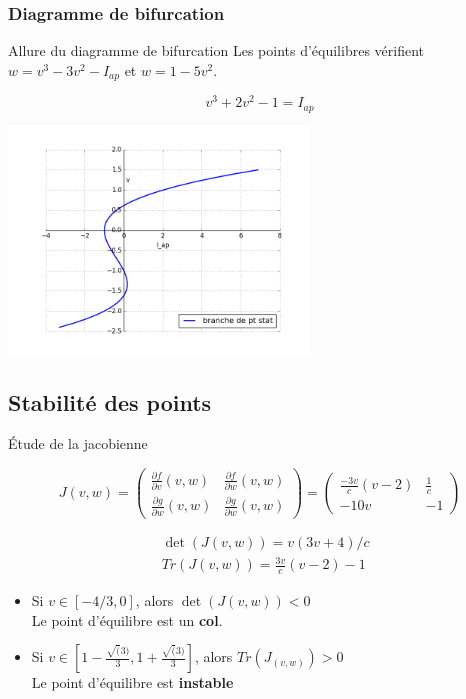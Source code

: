 \documentclass[xcolor={dvipsnames},10pt]{beamer}
\begin{document}
\subsubsection*{Diagramme de bifurcation}

\begin{frame}{Allure du diagramme de bifurcation}
Les points d'équilibres vérifient $w = v^3 - 3 v^2 - I_{ap}$ et $w = 1-5v^2$.


\begin{equation*}
v^3 + 2 v^2 -1 =I_{ap}
\end{equation*}
\begin{center}
\includegraphics[width=0.6\textwidth]{bif1.png}
\end{center}
\end{frame}



\subsection{Stabilité des points}
\begin{frame}{Étude de la jacobienne}

\begin{equation*}
J(v,w)=
\begin{pmatrix}
{\frac{\partial f}{\partial v}(v,w)} & {\frac{\partial f}{\partial w}(v,w)} \\ {\frac{\partial g}{\partial w}(v,w)} & {\frac{\partial g}{\partial w}(v,w)}
\end{pmatrix}
=
\begin{pmatrix}
{\frac{-3v}{c}(v-2)} & \displaystyle{\frac{1}{c}} \\ -10v & -1
\end{pmatrix}
\end{equation*}

\begin{align*}
&\det(J(v,w)) = v(3v+4)/c \\
& Tr(J(v,w)) = \frac{3v}{c}(v-2) -1
\end{align*}

\begin{itemize}
\item<2-> Si $v \in [-4/3,0]$, alors $\det(J(v,w))<0$ \\
		 Le point d'équilibre est un \textbf{col}.
\item<3> Si $v \in [1-\frac{\sqrt(3)}{3}, 1 + \frac{\sqrt(3)}{3}]$, alors $Tr(J_(v,w))>0$ \\
		 Le point d'équilibre est \textbf{instable}
\end{itemize}
\end{frame}
\end{document}
